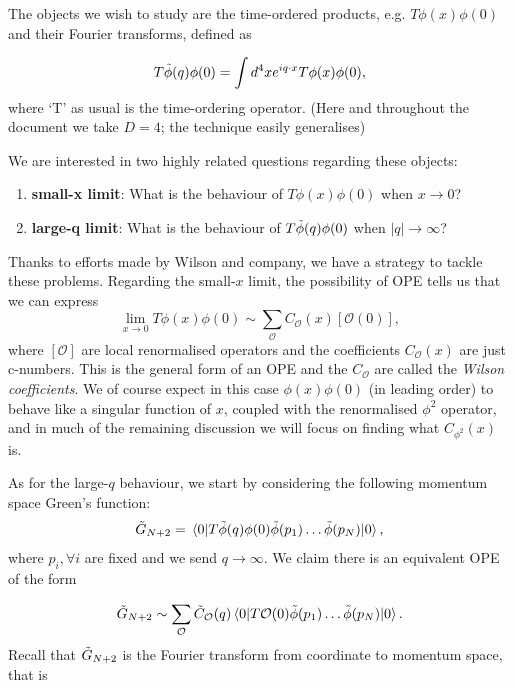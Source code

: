\documentclass{article}
\begin{document}
The objects we wish to study are the time-ordered products, e.g. $T\phi(x)\phi(0)$ and their Fourier transforms, defined as

\begin{equation}
    T\Tilde{\phi}(q)\phi(0) = \int d^4x e^{iq\cdot x} T\phi(x)\phi(0),
\end{equation}
where `T' as usual is the time-ordering operator. (Here and throughout the document we take $D=4$; the technique easily generalises)

We are interested in two highly related questions regarding these objects:

\begin{enumerate}
    \item \textbf{small-x limit}: What is the behaviour of $T\phi(x)\phi(0)$ when $x\rightarrow 0$? 
    \item \textbf{large-q limit}: What is the behaviour of $T\Tilde{\phi}(q)\phi(0)$ when $\vert q\vert \rightarrow\infty$?
\end{enumerate}

Thanks to efforts made by Wilson \cite{wilson} and company, we have a strategy to tackle these problems. Regarding the small-$x$ limit, the possibility of OPE tells us that we can express 
 \begin{equation}
     \lim_{x\rightarrow 0}T\phi(x)\phi(0) \sim \sum_\mathcal{O} C_\mathcal{O}(x)[\mathcal{O}(0)],
     \label{small x ope}
 \end{equation}
 where $[\mathcal{O}]$ are local renormalised operators and the coefficients $C_\mathcal{O}(x)$ are just c-numbers.  This is the general form of an OPE and the $C_\mathcal{O}$ are called the \textit{Wilson coefficients}. We of course expect in this case $\phi(x)\phi(0)$ (in leading order) to behave like a singular function of $x$, coupled with the renormalised $\phi^2$ operator, and in much of the remaining discussion we will focus on finding what $C_{\phi^2}(x)$ is.

 
 As for the large-$q$ behaviour, we start by considering the following momentum space Green's function:
 \begin{equation}
     \Tilde{G}_{N+2} = \mel{0}{T\Tilde{\phi}(q)\phi(0)\Tilde{\phi}(p_1)\dots\Tilde{\phi}(p_N)}{0},
 \end{equation}
 where $p_i,\forall i$ are fixed and we send $q\rightarrow \infty$. We claim there is an equivalent OPE of the form
 
 \begin{equation}
     \Tilde{G}_{N+2} \sim \sum_\mathcal{O} \Tilde{C}_\mathcal{O}(q) \mel{0}{T\mathcal{O}(0)\Tilde{\phi}(p_1)\dots\Tilde{\phi}(p_N)}{0}.
     \label{large q ope}
 \end{equation}
 Recall that $\Tilde{G}_{N+2}$ is the Fourier transform from coordinate to momentum space, that is
 
\end{document}
